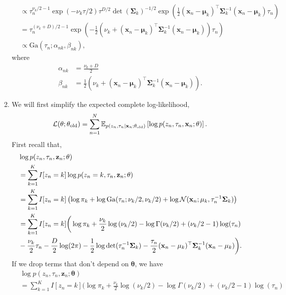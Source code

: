 \begin{enumerate}[label = (\alph*)]
\begin{align*}
        &\propto \tau_n^{\nu_k/2 - 1}\exp\left(-\nu_k\tau/2\right)\tau^{D/2}\det(\mathbf{\Sigma}_k)^{-1/2}\exp\left(\frac{1}{2}(\mathbf{x}_n-\mathbf{\mu}_k)^\top\mathbf{\Sigma}_k^{-1}(\mathbf{x}_n - \mathbf{\mu}_k)\tau_n\right)\\
        &=\tau_n^{(\nu_k+D)/2 - 1}\exp\left(-\frac{1}{2}\left(\nu_k + (\mathbf{x}_n-\mathbf{\mu}_k)^\top\mathbf{\Sigma}_k^{-1}(\mathbf{x}_n - \mathbf{\mu}_k)\right)\tau_n\right)\\
        &\propto \mathrm{Ga}(\tau_n; \alpha_{nk},\beta_{nk}),
    \end{align*}
    where
    \begin{align*}
        \alpha_{nk}&=\frac{\nu_k+D}{2}\\
        \beta_{nk}&=\frac{1}{2}\left(\nu_k + (\mathbf{x}_n-\mathbf{\mu}_k)^\top\mathbf{\Sigma}_k^{-1}(\mathbf{x}_n - \mathbf{\mu}_k)\right).
    \end{align*}
    \item We will first simplify the expected complete log-likelihood,
    \[\mathcal{L}(\mathbf{\theta};\mathbf{\theta}_{\mathrm{old}}) = \sum_{n=1}^N {\mathbb E}_{p(z_n, \tau_n \mid \mathbf{x}_n;\mathbf{\theta}_{\mathrm{old}})}\left[\log p(z_n,\tau_n,\mathbf{x}_n;\mathbf{\theta})\right]. \]
    First recall that,
    \begin{align*}
        &\log p(z_n,\tau_n,\mathbf{z}_n;\mathbf{\theta})\\
        &=\sum_{k=1}^K I[z_n = k]\log p(z_n = k,\tau_n,\mathbf{z}_n;\mathbf{\theta})\\
        &=\sum_{k=1}^K I[z_n = k]\left(\log \pi_k + \log \mathrm{Ga}(\tau_n;\nu_k/2,\nu_k/2) + \log {\mathcal N}(\mathbf{x}_n; \mathbf{\mu}_k, \tau_n^{-1}\mathbf{\Sigma}_k)\right)\\
        &=\sum_{k=1}^K I[z_n = k]\bigg(\log \pi_k + \frac{\nu_k}{2}\log\left(\nu_k/2\right) - \log \Gamma(\nu_k/2) + (\nu_k/2-1)\log(\tau_n)\\
        & - \frac{\nu_k}{2}\tau_n- \frac{D}{2}\log(2\pi) -\frac{1}{2}\log \det(\tau_n^{-1}\mathbf{\Sigma}_k) - \frac{\tau_n}{2}(\mathbf{x}_n - \mathbf{\mu}_k)^\top \mathbf{\Sigma}_k^{-1}(\mathbf{x}_n - \mathbf{\mu}_k) \bigg).
    \end{align*}
    If we drop terms that don't depend on $\mathbf{\theta}$, we have
    \begin{align}
        &\log p(z_n,\tau_n,\mathbf{z}_n;\mathbf{\theta})\nonumber \\
        &=\sum_{k=1}^K I[z_n = k]\bigg(\log \pi_k + \frac{\nu_k}{2}\log\left(\nu_k/2\right) - \log \Gamma(\nu_k/2) + (\nu_k/2-1)\log(\tau_n)\nonumber \\

\end{align}
\end{enumerate}

